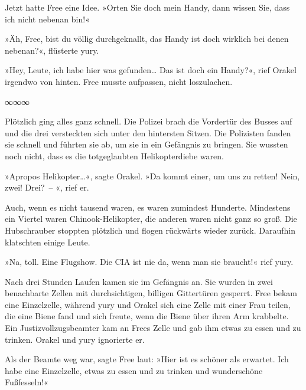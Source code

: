 Jetzt hatte Free eine Idee. »Orten Sie doch mein Handy, dann wissen Sie, dass ich nicht nebenan bin!«


\begin{small}»Äh, Free, bist du völlig durchgeknallt, das Handy ist doch wirklich bei denen nebenan?«, flüsterte yury.\end{small}

»Hey, Leute, ich habe hier was gefunden… Das ist doch ein Handy?«, rief Orakel irgendwo von hinten. Free musste aufpassen, nicht loszulachen.

\begin{center}
    ∞∞∞
\end{center}

Plötzlich ging alles ganz schnell. Die Polizei brach die Vordertür des Busses auf und die drei versteckten sich unter den hintersten Sitzen. Die Polizisten fanden sie schnell und führten sie ab, um sie in ein Gefängnis zu bringen. Sie wussten noch nicht, dass es die totgeglaubten Helikopterdiebe waren.

»Apropos Helikopter…«, sagte Orakel. »Da kommt einer, um uns zu retten! Nein, zwei! Drei?~– «, rief er.

Auch, wenn es nicht tausend waren, es waren zumindest Hunderte. Mindestens ein Viertel waren Chinook-Helikopter, die anderen waren nicht ganz so groß. Die Hubschrauber stoppten plötzlich und flogen rückwärts wieder zurück. Daraufhin klatschten einige Leute.

»Na, toll. Eine Flugshow. Die CIA ist nie da, wenn man sie braucht!« rief yury.

Nach drei Stunden Laufen kamen sie im Gefängnis an. Sie wurden in zwei benachbarte Zellen mit durchsichtigen, billigen Gittertüren gesperrt. Free bekam eine Einzelzelle, während yury und Orakel sich eine Zelle mit einer Frau teilen, die eine Biene fand und sich freute, wenn die Biene über ihren Arm krabbelte. Ein Justizvollzugsbeamter kam an Frees Zelle und gab ihm etwas zu essen und zu trinken. Orakel und yury ignorierte er.

Als der Beamte weg war, sagte Free laut: »Hier ist es schöner als erwartet. Ich habe eine Einzelzelle, etwas zu essen und zu trinken und wunderschöne Fußfesseln!«

